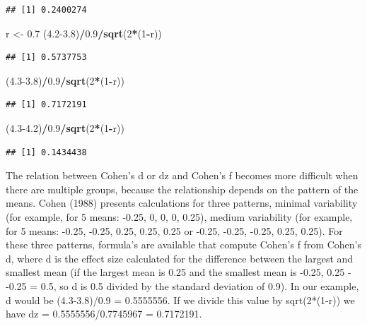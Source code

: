\documentclass[]{book}
\newenvironment{Shaded}{\begin{snugshade}}{\end{snugshade}}
\newcommand{\DecValTok}[1]{\textcolor[rgb]{0.00,0.00,0.81}{#1}}
\newcommand{\FloatTok}[1]{\textcolor[rgb]{0.00,0.00,0.81}{#1}}
\newcommand{\KeywordTok}[1]{\textcolor[rgb]{0.13,0.29,0.53}{\textbf{#1}}}
\newcommand{\NormalTok}[1]{#1}
\newcommand{\OperatorTok}[1]{\textcolor[rgb]{0.81,0.36,0.00}{\textbf{#1}}}
\newcommand{\StringTok}[1]{\textcolor[rgb]{0.31,0.60,0.02}{#1}}
\begin{document}
\begin{verbatim}
## [1] 0.2400274
\end{verbatim}

\begin{Shaded}
\begin{Highlighting}[]
\NormalTok{r <-}\StringTok{ }\FloatTok{0.7}
\NormalTok{(}\FloatTok{4.2-3.8}\NormalTok{)}\OperatorTok{/}\FloatTok{0.9}\OperatorTok{/}\KeywordTok{sqrt}\NormalTok{(}\DecValTok{2}\OperatorTok{*}\NormalTok{(}\DecValTok{1}\OperatorTok{-}\NormalTok{r))}
\end{Highlighting}
\end{Shaded}

\begin{verbatim}
## [1] 0.5737753
\end{verbatim}

\begin{Shaded}
\begin{Highlighting}[]
\NormalTok{(}\FloatTok{4.3-3.8}\NormalTok{)}\OperatorTok{/}\FloatTok{0.9}\OperatorTok{/}\KeywordTok{sqrt}\NormalTok{(}\DecValTok{2}\OperatorTok{*}\NormalTok{(}\DecValTok{1}\OperatorTok{-}\NormalTok{r))}
\end{Highlighting}
\end{Shaded}

\begin{verbatim}
## [1] 0.7172191
\end{verbatim}

\begin{Shaded}
\begin{Highlighting}[]
\NormalTok{(}\FloatTok{4.3-4.2}\NormalTok{)}\OperatorTok{/}\FloatTok{0.9}\OperatorTok{/}\KeywordTok{sqrt}\NormalTok{(}\DecValTok{2}\OperatorTok{*}\NormalTok{(}\DecValTok{1}\OperatorTok{-}\NormalTok{r))}
\end{Highlighting}
\end{Shaded}

\begin{verbatim}
## [1] 0.1434438
\end{verbatim}

The relation between Cohen's d or dz and Cohen's f becomes more difficult when there are multiple groups, because the relationship depends on the pattern of the means. Cohen (1988) presents calculations for three patterns, minimal variability (for example, for 5 means: -0.25, 0, 0, 0, 0.25), medium variability (for example, for 5 means: -0.25, -0.25, 0.25, 0.25, 0.25 or -0.25, -0.25, -0.25, 0.25, 0.25). For these three patterns, formula's are available that compute Cohen's f from Cohen's d, where d is the effect size calculated for the difference between the largest and smallest mean (if the largest mean is 0.25 and the smallest mean is -0.25, 0.25 - -0.25 = 0.5, so d is 0.5 divided by the standard deviation of 0.9). In our example, d would be (4.3-3.8)/0.9 = 0.5555556. If we divide this value by sqrt(2*(1-r)) we have dz = 0.5555556/0.7745967 = 0.7172191.
\end{document}
